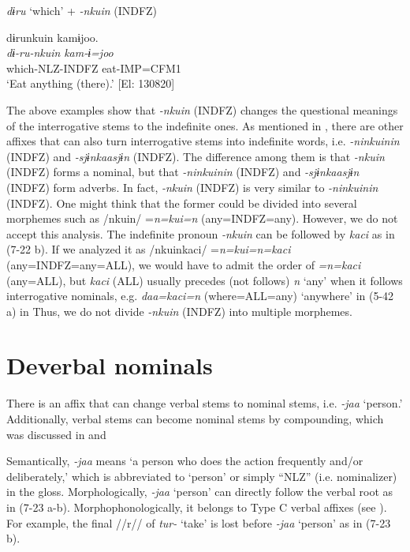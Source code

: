 \ex \label{ex:7:22e} \textit{dɨru} ‘which’ + \textit{{}-nkuin} (INDFZ)

\glll  dɨrunkuin  kamɨjoo.\\
\textit{dɨ-ru-nkuin}  \textit{kam-ɨ=joo}\\
which-NLZ-INDFZ  eat-IMP=CFM1\\
\glt ‘Eat anything (there).’ [El: 130820]
\z
\z

The above examples show that \textit{{}-nkuin} (INDFZ) changes the questional meanings of the interrogative stems to the indefinite ones. As mentioned in , there are other affixes that can also turn interrogative stems into indefinite words, i.e. \textit{{}-ninkuinin} (INDFZ) and \textit{{}-sjɨnkaasjɨn} (INDFZ). The difference among them is that \textit{{}-nkuin} (INDFZ) forms a nominal, but that \textit{{}-ninkuinin} (INDFZ) and \textit{{}-sjɨnkaasjɨn} (INDFZ) form adverbs. In fact, \textit{{}-nkuin} (INDFZ) is very similar to \textit{{}-ninkuinin} (INDFZ). One might think that the former could be divided into several morphemes such as /nkuin/ =\textit{n=kui=n} (any=INDFZ=any). However, we do not accept this analysis. The indefinite pronoun \textit{{}-nkuin} can be followed by \textit{kaci} as in (7-22 b). If we analyzed it as /nkuinkaci/ =\textit{n=kui=n=kaci} (any=INDFZ=any=ALL), we would have to admit the order of \textit{=n=kaci} (any=ALL), but \textit{kaci} (ALL) usually precedes (not follows) \textit{n} ‘any’ when it follows interrogative nominals, e.g. \textit{daa=kaci=n} (where=ALL=any) ‘anywhere’ in (5-42 a) in  Thus, we do not divide \textit{{}-nkuin} (INDFZ) into multiple morphemes.

\section{Deverbal nominals}

There is an affix that can change verbal stems to nominal stems, i.e. \textit{{}-jaa} ‘person.’ Additionally, verbal stems can become nominal stems by compounding, which was discussed in  and 

Semantically, \textit{{}-jaa} means ‘a person who does the action frequently and/or deliberately,’ which is abbreviated to ‘person’ or simply “NLZ” (i.e. nominalizer) in the gloss. Morphologically, \textit{-jaa} ‘person’ can directly follow the verbal root as in (7-23 a-b). Morphophonologically, it belongs to Type C verbal affixes (see ). For example, the final //r// of \textit{tur-} ‘take’ is lost before \textit{{}-jaa} ‘person’ as in (7-23 b).

